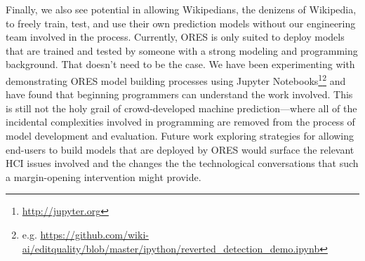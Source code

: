 Finally, we also see potential in allowing Wikipedians, the denizens of Wikipedia, to freely train, test, and use their own prediction models without our engineering team involved in the process.  Currently, ORES is only suited to deploy models that are trained and tested by someone with a strong modeling and programming background.  That doesn't need to be the case.  We have been experimenting with demonstrating ORES model building processes using Jupyter Notebooks\footnote{\url{http://jupyter.org}}\footnote{e.g. \url{ https://github.com/wiki-ai/editquality/blob/master/ipython/reverted_detection_demo.ipynb}} and have found that beginning programmers can understand the work involved.  This is still not the holy grail of crowd-developed machine prediction---where all of the incidental complexities involved in programming are removed from the process of model development and evaluation.  Future work exploring strategies for allowing end-users to build models that are deployed by ORES would surface the relevant HCI issues involved and the changes the the technological conversations that such a margin-opening intervention might provide.
